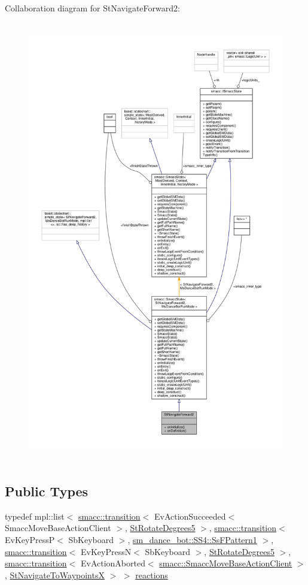 Collaboration diagram for St\+Navigate\+Forward2\+:
\nopagebreak
\begin{figure}[H]
\begin{center}
\leavevmode
\includegraphics[height=550pt]{structStNavigateForward2__coll__graph}
\end{center}
\end{figure}
\subsection*{Public Types}
\begin{DoxyCompactItemize}
\item 
typedef mpl\+::list$<$ \hyperlink{classsmacc_1_1transition}{smacc\+::transition}$<$ Ev\+Action\+Succeeded$<$ Smacc\+Move\+Base\+Action\+Client $>$, \hyperlink{structStRotateDegrees5}{St\+Rotate\+Degrees5} $>$, \hyperlink{classsmacc_1_1transition}{smacc\+::transition}$<$ Ev\+Key\+PressP$<$ Sb\+Keyboard $>$, \hyperlink{structsm__dance__bot_1_1SS4_1_1SsFPattern1}{sm\+\_\+dance\+\_\+bot\+::\+S\+S4\+::\+Ss\+F\+Pattern1} $>$, \hyperlink{classsmacc_1_1transition}{smacc\+::transition}$<$ Ev\+Key\+PressN$<$ Sb\+Keyboard $>$, \hyperlink{structStRotateDegrees5}{St\+Rotate\+Degrees5} $>$, \hyperlink{classsmacc_1_1transition}{smacc\+::transition}$<$ Ev\+Action\+Aborted$<$ \hyperlink{classsmacc_1_1SmaccMoveBaseActionClient}{smacc\+::\+Smacc\+Move\+Base\+Action\+Client} $>$, \hyperlink{structStNavigateToWaypointsX}{St\+Navigate\+To\+WaypointsX} $>$ $>$ \hyperlink{structStNavigateForward2_a95ac001eebeb059d623ae3332b2b353f}{reactions}
\end{DoxyCompactItemize}
